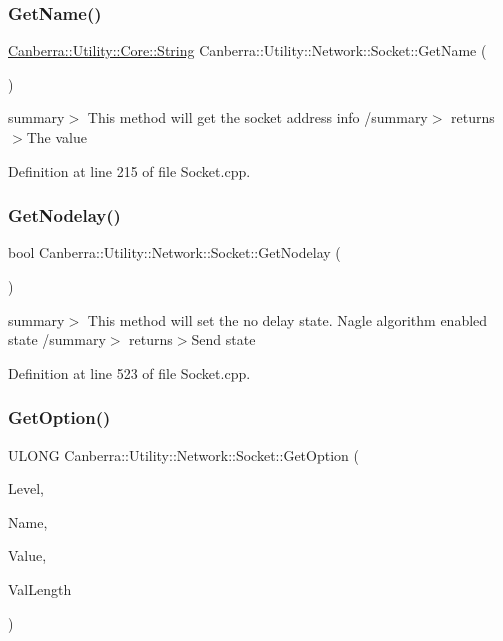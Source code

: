 \subsubsection{\texorpdfstring{Get\+Name()}{GetName()}}
{\footnotesize\ttfamily \hyperlink{class_canberra_1_1_utility_1_1_core_1_1_string}{Canberra\+::\+Utility\+::\+Core\+::\+String} Canberra\+::\+Utility\+::\+Network\+::\+Socket\+::\+Get\+Name (\begin{DoxyParamCaption}{ }\end{DoxyParamCaption})}

summary$>$ This method will get the socket address info /summary$>$ returns$>$The value

Definition at line 215 of file Socket.\+cpp.

\mbox{\label{class_canberra_1_1_utility_1_1_network_1_1_socket_acea1b08155d9d26e7fa9d58607114c8f_acea1b08155d9d26e7fa9d58607114c8f}} 
\subsubsection{\texorpdfstring{Get\+Nodelay()}{GetNodelay()}}
{\footnotesize\ttfamily bool Canberra\+::\+Utility\+::\+Network\+::\+Socket\+::\+Get\+Nodelay (\begin{DoxyParamCaption}{ }\end{DoxyParamCaption})}

summary$>$ This method will set the no delay state. Nagle algorithm enabled state /summary$>$ returns$>$Send state

Definition at line 523 of file Socket.\+cpp.

\mbox{\label{class_canberra_1_1_utility_1_1_network_1_1_socket_a461a6bdb1f66e4e1630d2d7b8243dc48_a461a6bdb1f66e4e1630d2d7b8243dc48}} 
\subsubsection{\texorpdfstring{Get\+Option()}{GetOption()}}
{\footnotesize\ttfamily U\+L\+O\+NG Canberra\+::\+Utility\+::\+Network\+::\+Socket\+::\+Get\+Option (\begin{DoxyParamCaption}\item[{L\+O\+NG}]{Level,  }\item[{L\+O\+NG}]{Name,  }\item[{char $\ast$}]{Value,  }\item[{L\+O\+NG $\ast$}]{Val\+Length }\end{DoxyParamCaption})}

